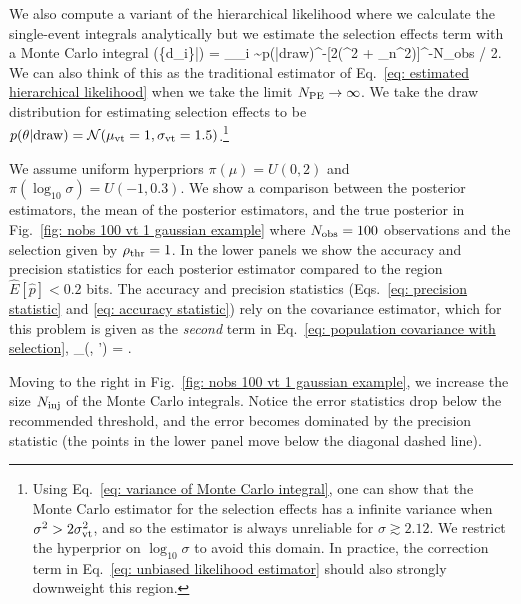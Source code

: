 \documentclass[%
 reprint,
 amsmath,amssymb,
 aps,nofootinbib,nobibnotes,onecolumn,prd
]{revtex4-2}
\begin{document}
We also compute a variant of the hierarchical likelihood where we calculate the single-event integrals analytically but we estimate the selection effects term with a Monte Carlo integral
\beq
{}(\{d_i\}|\Lambda) = \left[\frac{1}{\Ninj}\sum_{j=1}^{\Nfound}\frac{p(\theta_{i}|\Lambda)}{p(\theta_{i}|{\rm draw})}\right]_{\theta_{i} \sim p(\theta|{\rm draw})}^{-\Nobs}[2\pi(\sigma^2 + \sigma_n^2)]^{-N_{\rm obs} / 2}\exp\left[-\sum_{j=1}^{N_{\rm obs}}\frac{(d_j - \mu)^2}{2(\sigma^2 + \sigma_n^2)}\right].
\label{eq: estimated gaussian likelihood with vt}
\eeq
We can also think of this as the traditional estimator of Eq.~\ref{eq: estimated hierarchical likelihood} when we take the limit $N_{\rm PE} \to \infty$. We take the draw distribution for estimating selection effects to be $p(\theta|{\rm draw}) = \mathcal{N}(\mu_{\rm vt}=1,\sigma_{\rm vt}=1.5)$.\footnote{Using Eq.~\ref{eq: variance of Monte Carlo integral}, one can show that the Monte Carlo estimator for the selection effects has a infinite variance when $\sigma^2 > 2\sigma_{\rm vt}^2$, and so the estimator is always unreliable for $\sigma \gtrsim 2.12$. We restrict the hyperprior on $\log_{10}\sigma$ to avoid this domain. In practice, the correction term in Eq.~\ref{eq: unbiased likelihood estimator} should also strongly downweight this region.}

We assume uniform hyperpriors $\pi(\mu)=U(0,2)$ and $\pi(\log_{10}\sigma) = U(-1,0.3)$.
We show a comparison between the posterior estimators, the mean of the posterior estimators, and the true posterior in Fig.~\ref{fig: nobs 100 vt 1 gaussian example} where $N_{\rm obs}=100$ observations and the selection given by $\rho_{\rm thr} = 1$. In the lower panels we show the accuracy and precision statistics for each posterior estimator compared to the region $\hat{E}[\hat{p}] < 0.2$ bits.
The accuracy and precision statistics (Eqs.~\ref{eq: precision statistic} and \ref{eq: accuracy statistic}) rely on the covariance estimator, which for this problem is given as the \textit{second} term in Eq.~\ref{eq: population covariance with selection},
\beq
{}_{\ln{}}(\Lambda, \Lambda') = .
\label{eq: vt gaussian example covariance}    
\eeq

Moving to the right in Fig.~\ref{fig: nobs 100 vt 1 gaussian example}, we increase the size $N_{\rm inj}$ of the Monte Carlo integrals. Notice the error statistics drop below the recommended threshold, and the error becomes dominated by the precision statistic (the points in the lower panel move below the diagonal dashed line).
\end{document}
